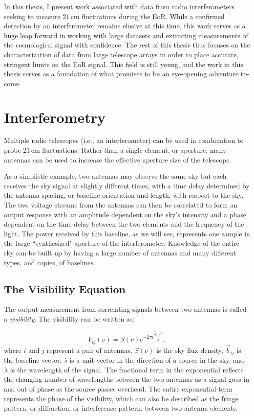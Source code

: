 In this thesis, I present work associated with data from radio interferometers seeking to measure $21$\,cm fluctuations during the EoR. While a confirmed detection by an interferometer remains elusive at this time, this work serves as a huge leap forward in working with large datasets and extracting measurements of the cosmological signal with confidence. The rest of this thesis thus focuses on the characterization of data from large telescope arrays in order to place accurate, stringent limits on the EoR signal. This field is still young, and the work in this thesis serves as a foundation of what promises to be an eye-opening adventure to-come.

\section{Interferometry}
\label{sec:interferometry}

Multiple radio telescopes (i.e., an interferometer) can be used in combination to probe $21$\,cm fluctuations. Rather than a single element, or aperture, many antennas can be used to increase the effective aperture size of the telescope.

As a simplistic example, two antennas may observe the same sky but each receives the sky signal at slightly different times, with a time delay determined by the antenna spacing, or baseline orientation and length, with respect to the sky. The two voltage streams from the antennas can then be correlated to form an output response with an amplitude dependent on the sky's intensity and a phase dependent on the time delay between the two elements and the frequency of the light. The power received by this baseline, as we will see, represents one sample in the large ``synthesized" aperture of the interferometer. Knowledge of the entire sky can be built up by having a large number of antennas and many different types, and copies, of baselines.

\subsection{The Visibility Equation}

The output measurement from correlating signals between two antennas is called a \textit{visibility}. The visibility can be written as:

\begin{equation}
\label{eq:vis}
V_{ij}(\nu) = S(\nu) e^{-2\pi i\frac{\vec{b}_{ij}\cdot \hat{s}}{\lambda}},
\end{equation}
where $i$ and $j$ represent a pair of antennas, $S(\nu)$ is the sky flux density, $\vec{b}_{ij}$ is the baseline vector, $\hat{s}$ is a unit-vector in the direction of a source in the sky, and $\lambda$ is the wavelength of the signal. The fractional term in the exponential reflects the changing number of wavelengths between the two antennas as a signal goes in and out of phase as the source passes overhead. The entire exponential term represents the phase of the visibility, which can also be described as the fringe pattern, or diffraction, or interference pattern, between two antenna elements. 

